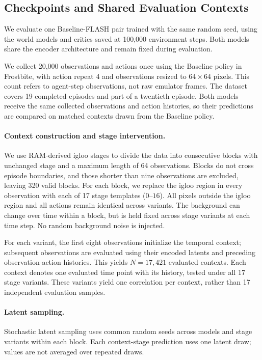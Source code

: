 \documentclass{article} %
\begin{document}
\subsection{Checkpoints and Shared Evaluation Contexts}
We evaluate one Baseline-FLASH pair trained with the same random seed, using the world models and critics saved at 100,000 environment steps. Both models share the encoder architecture and remain fixed during evaluation.

We collect 20,000 observations and actions once using the Baseline policy in Frostbite, with action repeat 4 and observations resized to $64\times64$ pixels. This count refers to agent-step observations, not raw emulator frames. The dataset covers 19 completed episodes and part of a twentieth episode. Both models receive the same collected observations and action histories, so their predictions are compared on matched contexts drawn from the Baseline policy.

\paragraph{Context construction and stage intervention.}
We use RAM-derived igloo stages to divide the data into consecutive blocks with unchanged stage and a maximum length of 64 observations. Blocks do not cross episode boundaries, and those shorter than nine observations are excluded, leaving 320 valid blocks. For each block, we replace the igloo region in every observation with each of 17 stage templates ($0$--$16$). All pixels outside the igloo region and all actions remain identical across variants. The background can change over time within a block, but is held fixed across stage variants at each time step. No random background noise is injected.

For each variant, the first eight observations initialize the temporal context; subsequent observations are evaluated using their encoded latents and preceding observation-action histories. This yields $N=17{,}421$ evaluated contexts. Each context denotes one evaluated time point with its history, tested under all 17 stage variants. These variants yield one correlation per context, rather than 17 independent evaluation samples.

\paragraph{Latent sampling.}
Stochastic latent sampling uses common random seeds across models and stage variants within each block. Each context-stage prediction uses one latent draw; values are not averaged over repeated draws.
\end{document}
